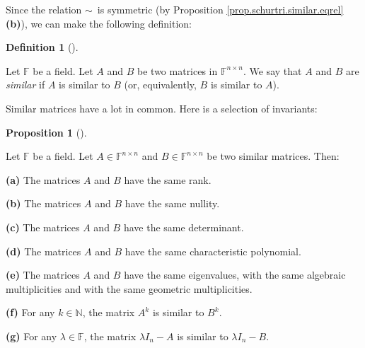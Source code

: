 \documentclass[numbers=enddot,12pt,final,onecolumn,notitlepage]{scrartcl}%
\numberwithin{exer}{subsection}
\theoremstyle{definition}
\newtheorem{prop}[theo]{Proposition}
\newenvironment{proposition}[1][]
{\begin{prop}[#1]\begin{leftbar}}
{\end{leftbar}\end{prop}}
\newtheorem{defi}[theo]{Definition}
\newenvironment{definition}[1][]
{\begin{defi}[#1]\begin{leftbar}}
{\end{leftbar}\end{defi}}
\begin{document}
Since the relation $\sim$\ is symmetric (by Proposition
\ref{prop.schurtri.similar.eqrel} \textbf{(b)}), we can make the following definition:

\begin{definition}
Let $\mathbb{F}$ be a field. Let $A$ and $B$ be two matrices in $\mathbb{F}%
^{n\times n}$. We say that $A$ and $B$ are \emph{similar} if $A$ is similar to
$B$ (or, equivalently, $B$ is similar to $A$).
\end{definition}

Similar matrices have a lot in common. Here is a selection of invariants:

\begin{proposition}
\label{prop.schurtri.similar.same}Let $\mathbb{F}$ be a field. Let
$A\in\mathbb{F}^{n\times n}$ and $B\in\mathbb{F}^{n\times n}$ be two similar
matrices. Then: \medskip

\textbf{(a)} The matrices $A$ and $B$ have the same rank. \medskip

\textbf{(b)} The matrices $A$ and $B$ have the same nullity. \medskip

\textbf{(c)} The matrices $A$ and $B$ have the same determinant. \medskip

\textbf{(d)} The matrices $A$ and $B$ have the same characteristic polynomial.
\medskip

\textbf{(e)} The matrices $A$ and $B$ have the same eigenvalues, with the same
algebraic multiplicities and with the same geometric multiplicities. \medskip

\textbf{(f)} For any $k\in\mathbb{N}$, the matrix $A^{k}$ is similar to
$B^{k}$. \medskip

\textbf{(g)} For any $\lambda\in\mathbb{F}$, the matrix $\lambda I_{n}-A$ is
similar to $\lambda I_{n}-B$.
\end{proposition}
\end{document}

